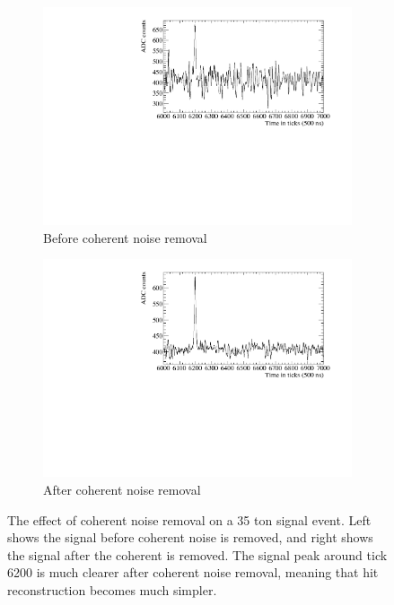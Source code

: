 \begin{figure}
  \centering
  \begin{subfigure}{0.48\textwidth}
    \centering
    \includegraphics[width=\textwidth]{BeforeCoherent}
    \caption{Before coherent noise removal}
  \end{subfigure}%
  \hspace{0.03\textwidth}%
  \begin{subfigure}{0.48\textwidth}
    \centering
    \includegraphics[width=\textwidth]{AfterCoherent}
    \caption{After coherent noise removal}
  \end{subfigure}
  \caption[Removing coherent noise in the 35 ton]
          {The effect of coherent noise removal on a 35 ton signal event. Left shows the signal before coherent noise is removed, and right shows the signal after the coherent is removed. The signal peak around tick 6200 is much clearer after coherent noise removal, meaning that hit reconstruction becomes much simpler.}
  \label{fig:CoherentNoise}
\end{figure}

